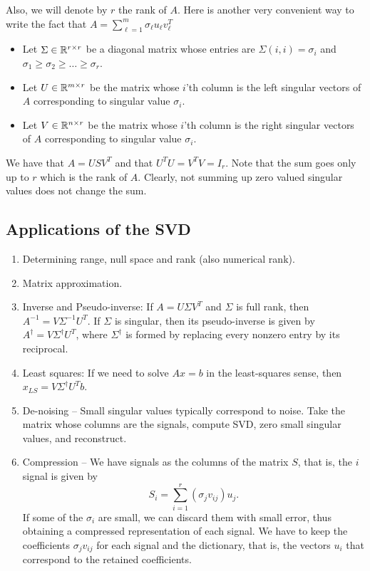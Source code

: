 \documentclass{article}
\begin{document}
Also, we will denote by $r$ the rank of $A$. 
Here is another very convenient way to write the fact that $A = \sum_{\ell=1}^{m} \sigma_{\ell} u_{\ell} v_{\ell}^{T}$
\begin{itemize}
\item Let $\Sigma \in {\mathbb{R}}^{r \times r}$ be a diagonal matrix whose entries are $\Sigma(i,i) = \sigma_i$ and $\sigma_1 \ge \sigma_2 \ge \ldots \ge \sigma_r$.
\item Let $U \in {\mathbb{R}}^{m \times r}$ be the matrix whose $i$'th column is the left singular vectors of $A$ corresponding to singular value $\sigma_i$.
\item Let $V \in {\mathbb{R}}^{n \times r}$ be the matrix whose $i$'th column is the right singular vectors of $A$ corresponding to singular value $\sigma_i$.
\end{itemize}
We have that $A = USV^T$ and that $U^{T}U = V^{T}V = I_r$. Note that the sum goes only up to $r$ which is the rank of $A$. Clearly, not summing up zero valued singular values does not change the sum.

\subsection*{Applications of the SVD}
\begin{enumerate}
\item Determining range, null space and rank (also numerical rank).
\item Matrix approximation.
\item Inverse and Pseudo-inverse: If $A=U \Sigma V^{T}$ and $\Sigma$
is full rank, then $A^{-1}=V \Sigma^{-1} U^{T}$. If $\Sigma$ is
singular, then its pseudo-inverse is given by $A^{\dagger}=V
\Sigma^{\dagger} U^{T}$, where $\Sigma^{\dagger}$ is formed by
replacing every nonzero entry by its reciprocal.
\item Least squares: If we need to solve $Ax=b$ in the least-squares
sense, then $x_{LS}=V \Sigma^{\dagger} U^{T} b$.
\item De-noising -- Small singular values typically correspond to
noise. Take the matrix whose columns are the signals, compute SVD,
zero small singular values, and reconstruct.
\item Compression -- We have signals as the columns of the matrix
$S$, that is, the $i$ signal is given by
\begin{equation*}
S_{i} = \sum_{i=1}^{r} \left ( \sigma_{j} v_{ij} \right ) u_{j}.
\end{equation*}
If some of the $\sigma_{i}$ are small, we can discard them with
small error, thus obtaining a compressed representation of each
signal. We have to keep the coefficients $\sigma_{j} v_{ij}$ for
each signal and the dictionary, that is, the vectors $u_{i}$ that
correspond to the retained coefficients.
\end{enumerate}
\end{document}
